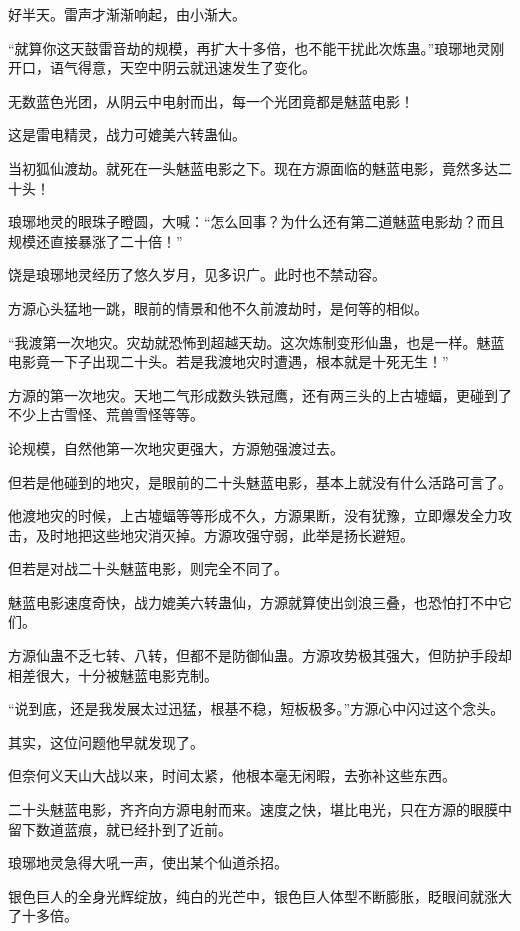 \begin{this_body}
好半天。雷声才渐渐响起，由小渐大。

“就算你这天鼓雷音劫的规模，再扩大十多倍，也不能干扰此次炼蛊。”琅琊地灵刚开口，语气得意，天空中阴云就迅速发生了变化。

无数蓝色光团，从阴云中电射而出，每一个光团竟都是魅蓝电影！

这是雷电精灵，战力可媲美六转蛊仙。

当初狐仙渡劫。就死在一头魅蓝电影之下。现在方源面临的魅蓝电影，竟然多达二十头！

琅琊地灵的眼珠子瞪圆，大喊：“怎么回事？为什么还有第二道魅蓝电影劫？而且规模还直接暴涨了二十倍！”

饶是琅琊地灵经历了悠久岁月，见多识广。此时也不禁动容。

方源心头猛地一跳，眼前的情景和他不久前渡劫时，是何等的相似。

“我渡第一次地灾。灾劫就恐怖到超越天劫。这次炼制变形仙蛊，也是一样。魅蓝电影竟一下子出现二十头。若是我渡地灾时遭遇，根本就是十死无生！”

方源的第一次地灾。天地二气形成数头铁冠鹰，还有两三头的上古墟蝠，更碰到了不少上古雪怪、荒兽雪怪等等。

论规模，自然他第一次地灾更强大，方源勉强渡过去。

但若是他碰到的地灾，是眼前的二十头魅蓝电影，基本上就没有什么活路可言了。

他渡地灾的时候，上古墟蝠等等形成不久，方源果断，没有犹豫，立即爆发全力攻击，及时地把这些地灾消灭掉。方源攻强守弱，此举是扬长避短。

但若是对战二十头魅蓝电影，则完全不同了。

魅蓝电影速度奇快，战力媲美六转蛊仙，方源就算使出剑浪三叠，也恐怕打不中它们。

方源仙蛊不乏七转、八转，但都不是防御仙蛊。方源攻势极其强大，但防护手段却相差很大，十分被魅蓝电影克制。

“说到底，还是我发展太过迅猛，根基不稳，短板极多。”方源心中闪过这个念头。

其实，这位问题他早就发现了。

但奈何义天山大战以来，时间太紧，他根本毫无闲暇，去弥补这些东西。

二十头魅蓝电影，齐齐向方源电射而来。速度之快，堪比电光，只在方源的眼膜中留下数道蓝痕，就已经扑到了近前。

琅琊地灵急得大吼一声，使出某个仙道杀招。

银色巨人的全身光辉绽放，纯白的光芒中，银色巨人体型不断膨胀，眨眼间就涨大了十多倍。


\end{this_body}
